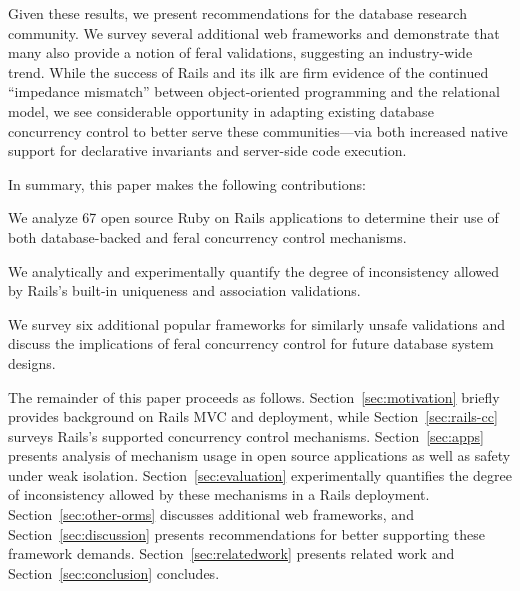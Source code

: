 Given these results, we present recommendations for the database
research community. We survey several additional web frameworks and
demonstrate that many also provide a notion of feral validations,
suggesting an industry-wide trend. While the success of Rails and its
ilk are firm evidence of the continued ``impedance mismatch'' between
object-oriented programming and the relational model, we see
considerable opportunity in adapting existing database concurrency
control to better serve these communities---via both increased native
support for declarative invariants and server-side code execution.

In summary, this paper makes the following contributions:
\begin{myitemize}
\item We analyze 67 open source Ruby on Rails applications to
  determine their use of both database-backed and feral concurrency
  control mechanisms.

\item We analytically and experimentally quantify the degree of
  inconsistency allowed by Rails's built-in uniqueness and association
  validations.

\item We survey six additional popular frameworks for similarly unsafe
  validations and discuss the implications of feral concurrency
  control for future database system designs.
\end{myitemize}

The remainder of this paper proceeds as
follows. Section~\ref{sec:motivation} briefly provides background on
Rails MVC and deployment, while Section~\ref{sec:rails-cc} surveys
Rails's supported concurrency control
mechanisms. Section~\ref{sec:apps} presents analysis of mechanism
usage in open source applications as well as safety under weak
isolation.  Section~\ref{sec:evaluation} experimentally quantifies the
degree of inconsistency allowed by these mechanisms in a Rails
deployment. Section~\ref{sec:other-orms} discusses additional web
frameworks, and Section~\ref{sec:discussion} presents recommendations
for better supporting these framework demands. Section~\ref{sec:relatedwork}
presents related work and Section~\ref{sec:conclusion} concludes.
